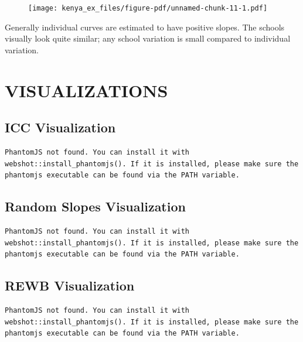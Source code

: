 \documentclass[
  letterpaper,
  DIV=11,
  numbers=noendperiod]{scrreprt}
\begin{document}
\begin{figure}[H]

{\centering \texttt{[image: kenya\_ex\_files/figure-pdf/unnamed-chunk-11-1.pdf]}

}

\end{figure}

Generally individual curves are estimated to have positive slopes. The
schools visually look quite similar; any school variation is small
compared to individual variation.

\part{VISUALIZATIONS}

\hypertarget{icc-visualization}{%
\chapter{ICC Visualization}\label{icc-visualization}}

\begin{verbatim}
PhantomJS not found. You can install it with webshot::install_phantomjs(). If it is installed, please make sure the phantomjs executable can be found via the PATH variable.
\end{verbatim}

\hypertarget{random-slopes-visualization}{%
\chapter{Random Slopes
Visualization}\label{random-slopes-visualization}}

\begin{verbatim}
PhantomJS not found. You can install it with webshot::install_phantomjs(). If it is installed, please make sure the phantomjs executable can be found via the PATH variable.
\end{verbatim}

\hypertarget{rewb-visualization}{%
\chapter{REWB Visualization}\label{rewb-visualization}}

\begin{verbatim}
PhantomJS not found. You can install it with webshot::install_phantomjs(). If it is installed, please make sure the phantomjs executable can be found via the PATH variable.
\end{verbatim}
\end{document}
